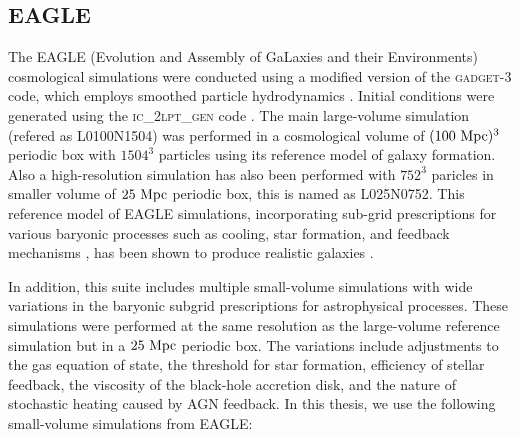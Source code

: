 \subsection{EAGLE}
\label{sec:sims-EAGLE}
The EAGLE (Evolution and Assembly of GaLaxies and their Environments) cosmological simulations were conducted using a modified version of the \textsc{gadget-3} code, which employs smoothed particle hydrodynamics \citep[][]{2005MNRAS.364.1105S}. Initial conditions were generated using the \textsc{ic\_2lpt\_gen} code \citep{2010MNRAS.403.1859J}. The main large-volume simulation (refered as L0100N1504) was performed in a cosmological volume of $(100 ~\rm{Mpc})^3$ periodic box with $1504^3$ particles using its reference model of galaxy formation. Also a high-resolution simulation has also been performed with $752^3$ paricles in smaller volume of $25 ~\rm{Mpc}$ periodic box, this is named as L025N0752. This reference model of EAGLE simulations, incorporating sub-grid prescriptions for various baryonic processes such as cooling, star formation, and feedback mechanisms \citep[][]{2015MNRAS.446..521S,2015MNRAS.450.1937C}, has been shown to produce realistic galaxies \citep[][]{2015MNRAS.448.2941S,2015MNRAS.450.4486F,2015MNRAS.452.2879T}.

In addition, this suite includes multiple small-volume simulations with wide variations in the baryonic subgrid prescriptions for astrophysical processes. These simulations were performed at the same resolution as the large-volume reference simulation but in a $25 ~\rm{Mpc}$ periodic box. The variations include adjustments to the gas equation of state, the threshold for star formation, efficiency of stellar feedback, the viscosity of the black-hole accretion disk, and the nature of stochastic heating caused by AGN feedback. In this thesis, we use the following small-volume simulations from EAGLE:

